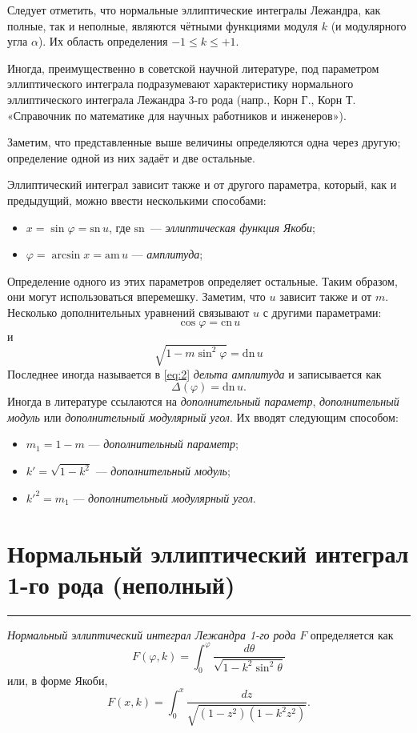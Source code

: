 \documentclass[fleqn]{article}
\newcommand{\sn}{\mathrm{sn}\,}
\newcommand{\am}{\mathrm{am}\,}
\newcommand{\cn}{\mathrm{cn}\,}
\newcommand{\dn}{\mathrm{dn}\,}
\begin{document}
	Следует отметить, что нормальные эллиптические интегралы Лежандра, как полные, так и неполные, являются чётными функциями модуля $k$ (и модулярного угла $\alpha$). Их область определения $-1 \leqslant k \leqslant +1$.
	
	Иногда, преимущественно в советской научной литературе, под параметром эллиптического интеграла подразумевают характеристику нормального эллиптического интеграла Лежандра 3-го рода (напр., Корн Г., Корн Т. «Справочник по математике для научных работников и инженеров»).
	
	Заметим, что представленные выше величины определяются одна через другую; определение одной из них задаёт и две остальные.
	
	Эллиптический интеграл зависит также и от другого параметра, который, как и предыдущий, можно ввести несколькими способами:
	\begin{itemize}
		\item $x=\sin{\varphi}=\sn u$, где $\sn$ --- \emph{эллиптическая функция Якоби};
		\item $\varphi = \arcsin{x} = \am u$ --- \emph{амплитуда};
	\end{itemize}
	Определение одного из этих параметров определяет остальные. Таким образом, они могут использоваться вперемешку. Заметим, что $u$ зависит также и от $m$. Несколько дополнительных уравнений связывают $u$ с другими параметрами:
	\begin{equation*}\cos{\varphi}=\cn u\end{equation*}
	и
	\begin{equation}\sqrt{1 - m \sin^2{\varphi}}=\dn u\label{eq:2} \end{equation}
	Последнее иногда называется в \eqref{eq:2} \emph{дельта амплитуда} и записывается как
	\begin{equation*}\Delta (\varphi) = \dn u.\end{equation*}
	Иногда в литературе ссылаются на \textit{дополнительный параметр}, \textit{дополнительный модуль} или \textit{дополнительный модулярный угол}. Их вводят следующим способом:
	\begin{itemize}
		\item $m_1=1-m$ --- \emph{дополнительный параметр};
		\item $k' = \sqrt{1 - k^2}$ --- \emph{дополнительный модуль};
		\item $k'^2=m_1$ --- \emph{дополнительный модулярный угол}.
	\end{itemize}
	\section{Нормальный эллиптический интеграл 1-го рода (неполный)}
	\hrule
	\emph{Нормальный эллиптический интеграл Лежандра 1-го рода} $F$ определяется как
	\begin{equation*}F(\varphi, k) = \int^\varphi_0\frac{d\theta}{\sqrt{1-k^2\sin^2{\theta}}}\end{equation*}
	или, в форме Якоби,
	\begin{equation*}F(x, k)=\int_0^x\frac{dz}{\sqrt{(1-z^2)(1-k^2z^2)}}.\end{equation*}
	
\end{document}

